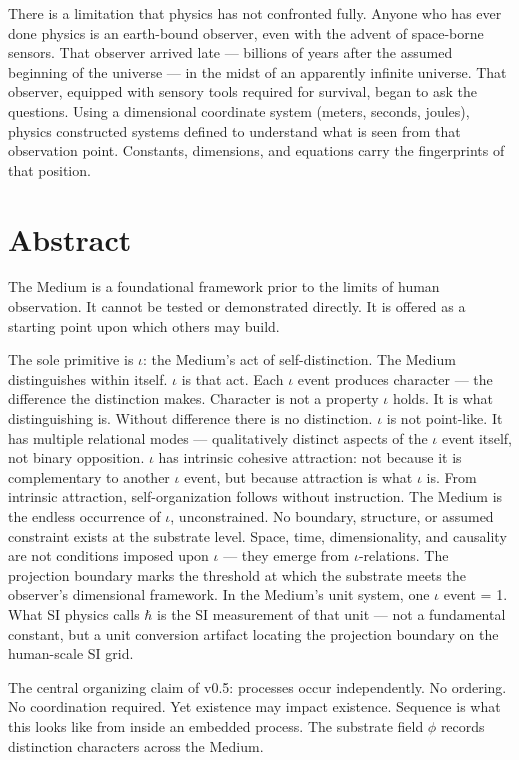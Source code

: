 \documentclass[11pt,letterpaper]{article}
\begin{document}
There is a limitation that physics has not confronted fully. Anyone who has ever done physics is an earth-bound observer, even with the advent of space-borne sensors. That observer arrived late --- billions of years after the assumed beginning of the universe --- in the midst of an apparently infinite universe. That observer, equipped with sensory tools required for survival, began to ask the questions. Using a dimensional coordinate system (meters, seconds, joules), physics constructed systems defined to understand what is seen from that observation point. Constants, dimensions, and equations carry the fingerprints of that position.

\section{Abstract}
\label{sec:orga573244}

The Medium is a foundational framework prior to the limits of human observation. It cannot be tested or demonstrated directly. It is offered as a starting point upon which others may build.


The sole primitive is \(\iota\): the Medium's act of self-distinction. The Medium distinguishes within itself. \(\iota\) is that act. Each \(\iota\) event produces character --- the difference the distinction makes. Character is not a property \(\iota\) holds. It is what distinguishing is. Without difference there is no distinction. \(\iota\) is not point-like. It has multiple relational modes --- qualitatively distinct aspects of the \(\iota\) event itself, not binary opposition. \(\iota\) has intrinsic cohesive attraction: not because it is complementary to another \(\iota\) event, but because attraction is what \(\iota\) is. From intrinsic attraction, self-organization follows without instruction. The Medium is the endless occurrence of \(\iota\), unconstrained. No boundary, structure, or assumed constraint exists at the substrate level. Space, time, dimensionality, and causality are not conditions imposed upon \(\iota\) --- they emerge from \(\iota\)-relations. The projection boundary marks the threshold at which the substrate meets the observer's dimensional framework. In the Medium's unit system, one \(\iota\) event = 1. What SI physics calls \(\hbar\) is the SI measurement of that unit --- not a fundamental constant, but a unit conversion artifact locating the projection boundary on the human-scale SI grid.

The central organizing claim of v0.5: processes occur independently. No ordering. No coordination required. Yet existence may impact existence. Sequence is what this looks like from inside an embedded process. The substrate field \(\phi\) records distinction characters across the Medium.
\end{document}
